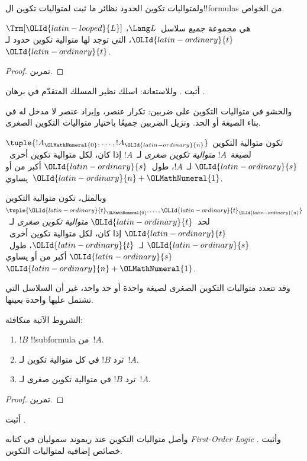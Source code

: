 \documentclass[../../../include/open-logic-section]{subfiles}
\begin{document}
ولمتواليات تكوين الحدود نظائر ما ثبت لمتواليات تكوين
ال!!{formula}s من الخواص.

\begin{prop}
$\Trm[{\OLId{latin-looped}{L}}]$ هي مجموعة جميع سلاسل~$\Lang L$، ${\OLId{latin-ordinary}{t}}$، التي توجد لها
متوالية تكوين حدود لـ~${\OLId{latin-ordinary}{t}}$.
\end{prop}

\begin{proof}
تمرين.
\end{proof}

\begin{prob}
أثبت .
وللاستعانة: اسلك نظير المسلك المتقدّم في برهان
.
\end{prob}

والحشو في متواليات التكوين على ضربين: تكرار عنصر، وإيراد عنصر
لا مدخل له في بناء الصيغة أو الحد. ونزيل الضربين جميعًا باختيار
متواليات التكوين الصغرى.

\begin{defn}
تكون متوالية التكوين $\tuple{!A_{\OLMathNumeral{0}}, \ldots, !A_{\OLId{latin-ordinary}{n}}}$ لصيغة~$!A$
\emph{متوالية تكوين صغرى} لـ~$!A$ إذا كان، لكل متوالية تكوين
أخرى~${\OLId{latin-ordinary}{s}}$ لـ~$!A$، طول~${\OLId{latin-ordinary}{s}}$ أكبر من أو يساوي~${\OLId{latin-ordinary}{n}}+{\OLMathNumeral{1}}$.

وبالمثل، تكون متوالية التكوين $\tuple{{\OLId{latin-ordinary}{t}}_{\OLMathNumeral{0}}, \ldots, {\OLId{latin-ordinary}{t}}_{\OLId{latin-ordinary}{n}}}$
لحد~${\OLId{latin-ordinary}{t}}$ \emph{متوالية تكوين صغرى} لـ~${\OLId{latin-ordinary}{t}}$ إذا كان، لكل متوالية
تكوين أخرى~${\OLId{latin-ordinary}{s}}$ لـ~${\OLId{latin-ordinary}{t}}$، طول~${\OLId{latin-ordinary}{s}}$ أكبر من أو يساوي~${\OLId{latin-ordinary}{n}}+{\OLMathNumeral{1}}$.
\end{defn}

وقد تتعدد متواليات التكوين الصغرى لصيغة واحدة أو حد واحد،
غير أن السلاسل التي تشتمل عليها واحدة بعينها.

\begin{prop}
الشروط الآتية متكافئة:
\begin{enumerate}
    \item $!B$ !!{subformula} من~$!A$.
    \item ترد $!B$ في كل متوالية تكوين لـ~$!A$.
    \item ترد $!B$ في متوالية تكوين صغرى لـ~$!A$.
\end{enumerate}
\end{prop}

\begin{proof}
تمرين.
\end{proof}

\begin{prob}
أثبت .
\end{prob}

\begin{history}
وأصل متواليات التكوين عند ريموند سموليان في كتابه
\emph{First-Order Logic} \citep{Smullyan1968}.
وأثبت \citet{Zuckerman1973} خصائص إضافية لمتواليات التكوين.
\end{history}
\end{document}

